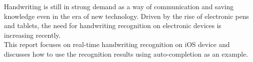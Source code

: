Handwriting is still in strong demand as a way of communication and saving knowledge
even in the era of new technology. Driven by the rise of electronic pens and tablets,
the need for handwriting recognition on electronic devices is increasing recently.\\
This report focuses on real-time handwriting recognition on iOS device and discusses
how to use the recognition results using auto-completion as an example.
